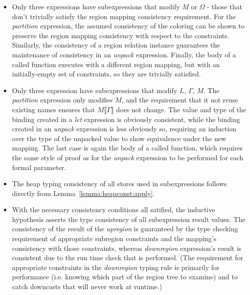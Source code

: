 \begin{itemize}

\item Only three expressions have subexpressions that modify $M$ or $\Omega$ - those that don't
trivially satisfy the region mapping consistency requirement.  For the
{\em partition} expression, the assumed consistency of the coloring can be shown to preserve
the region mapping consistency with respect to the constraints.  Similarly, the consistency of 
a region relation instance guarantees the maintenance of consistency in an {\em unpack}
expression.  Finally, the body of a called function executes with a different region mapping,
but with an initially-empty set of constraints, so they are trivially satisfied.

\item Only three expression have subexpressions that modify $L$, $\Gamma$, $M$.  The
{\em partition} expression only modifies $M$, and the requirement that it not reuse existing
names ensures that $M \llbracket \Gamma \rrbracket$ does not change.  The value and type of the
binding created in a {\em let} expression is obviously consistent, while the binding created in
an {\em unpack} expression is less obviously so, requiring an induction over the type of the 
unpacked value to show equivalence under the new mapping.  The last case is again the body of a
called function, which requires the same style of proof as for the {\em unpack} expression to
be performed for each formal parameter.

\item The heap typing consistency of all stores used in subexpressions follows directly from
Lemma~\ref{lemma:heapconst:apply}.

\item With the necessary consistency conditions all satified, the inductive hypothesis asserts
the type consistency of all subexpression result values.  The consistency of the result of 
the {\em upregion} is guaranteed by the type checking requirement of appropriate subregion
constraints and the mapping's consistency with those constraints, whereas {\em downregion}
expression's result is consistent due to the run time check that is performed.  (The requirement
for appropriate constraints in the {\em downregion} typing rule is primarily for performance
(i.e. knowing which part of the region tree to examine) and to catch downcasts that will never
work at runtime.)


\end{itemize}
